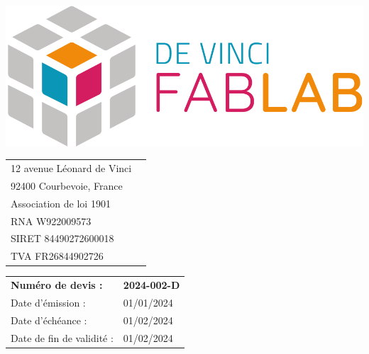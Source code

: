 \documentclass[11pt,a4paper]{article}
\begin{document}
\thispagestyle{empty}


\begin{minipage}{0.4\textwidth}
    \includegraphics[width=0.7\linewidth]{../assets/logo_fablab.png}

    \vspace{0.5cm}

    \begin{tabular}{ll}
        12 avenue Léonard de Vinci \\
        92400 Courbevoie, France   \\
        Association de loi 1901    \\
        RNA W922009573             \\
        SIRET 84490272600018       \\
        TVA  FR26844902726         \\
    \end{tabular}
\end{minipage}\begin{minipage}{0.6\textwidth}
    \begin{flushright}
        \begin{tabular}{ll}
            \textbf{Numéro de devis :} & \textbf{2024-002-D} \\
            Date d'émission :          & 01/01/2024          \\
            Date d'échéance :          & 01/02/2024          \\
            Date de fin de validité :  & 01/02/2024          \\
        \end{tabular}
    \end{flushright}
\end{minipage}
\end{document}
